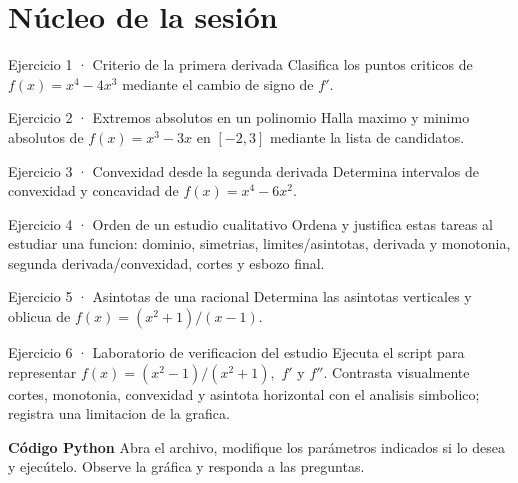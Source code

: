 \documentclass[10pt,a4paper,oneside,openany]{book}
\begin{document}
\section*{Núcleo de la sesión}
\begin{PSevenExerciseFixed}{Ejercicio 1 · Criterio de la primera derivada}
Clasifica los puntos criticos de \(f(x)=x^{4}-4x^{3}\) mediante el cambio de signo de \(f'\).
\end{PSevenExerciseFixed}
\begin{PSevenExerciseFixed}{Ejercicio 2 · Extremos absolutos en un polinomio}
Halla maximo y minimo absolutos de \(f(x)=x^{3}-3x\) en \([-2,3]\) mediante la lista de candidatos.
\end{PSevenExerciseFixed}
\begin{PSevenExerciseFixed}{Ejercicio 3 · Convexidad desde la segunda derivada}
Determina intervalos de convexidad y concavidad de \(f(x)=x^{4}-6x^{2}\).
\end{PSevenExerciseFixed}
\begin{PSevenExerciseFixed}{Ejercicio 4 · Orden de un estudio cualitativo}
Ordena y justifica estas tareas al estudiar una funcion: dominio, simetrias, limites/asintotas, derivada y monotonia, segunda derivada/convexidad, cortes y esbozo final.
\end{PSevenExerciseFixed}
\begin{PSevenExerciseFixed}{Ejercicio 5 · Asintotas de una racional}
Determina las asintotas verticales y oblicua de \(f(x)=(x^{2}+1)/(x-1)\).
\end{PSevenExerciseFixed}
\begin{PSevenExercise}{Ejercicio 6 · Laboratorio de verificacion del estudio}
Ejecuta el script para representar \(f(x)=(x^{2}-1)/(x^{2}+1),\) \(f'\) y \(f''\). Contrasta visualmente cortes, monotonia, convexidad y asintota horizontal con el analisis simbolico; registra una limitacion de la grafica.
\par\medskip\textbf{Código Python}
Abra el archivo, modifique los parámetros indicados si lo desea y
ejecútelo. Observe la gráfica y responda a las preguntas.\par\smallskip
{}
\end{PSevenExercise}
\end{document}
